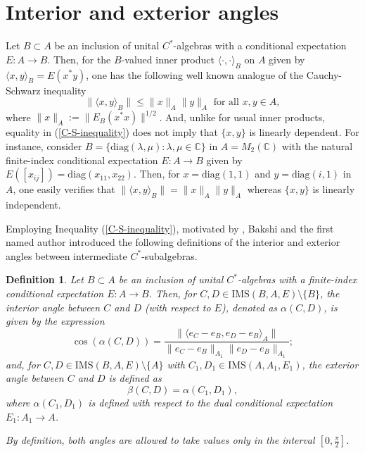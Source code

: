 \documentclass[a4]{amsart}
\newtheorem{definition}[theorem]{\bf Definition}
\numberwithin{equation}{section}
\newcommand{\la}{\langle}
\newcommand{\ra}{\rangle}
\newcommand{\C}{\mathbb{C}}
\begin{document}
\section{Interior and exterior angles}

     Let $B \subset A$ be an inclusion of unital $C^*$-algebras with a
     conditional expectation $E: A \to B$. Then, for the $B$-valued
     inner product $\la \cdot, \cdot\ra_B$ on $A$ given by $\la x, y
     \ra_B=E(x^*y)$, one has the following well known
     analogue of the Cauchy-Schwarz inequality
     \begin{equation}\label{C-S-inequality}
\|\la x, y \ra_B\| \leq \|x\|_A \|y\|_A \text{ for all } x, y \in A,
     \end{equation}
     where $\|x\|_A:=\|E_B(x^*x)\|^{1/2}$. And, unlike for usual inner products, equality in (\ref{C-S-inequality}) does
not imply that $\{x, y\}$ is linearly dependent. For instance,
consider $B = \{\mathrm{diag}(\lambda, \mu) : \lambda, \mu \in \C\}$
in $A= M_2(\C)$ with the natural finite-index conditional expectation
$E: A \to B$ given by $E([x_{ij}])= \mathrm{diag}(x_{11},
x_{22})$. Then, for $ x = \mathrm{diag}(1,1)$ and $ y =
\mathrm{diag}(i,1)$ in $A$, one easily verifies that
     \(
\|\la x, y \ra_B\| = \|x\|_A \|y\|_A
\)
whereas $\{x, y\}$ is linearly independent.

Employing Inequality (\ref{C-S-inequality}), motivated by
\cite{BDLR}, Bakshi and the first named author introduced the
following definitions of the interior and exterior angles between
intermediate $C^*$-subalgebras.
\begin{definition}\cite{BG2} 
     Let $B \subset A$ be an inclusion of unital $C^*$-algebras with a
     finite-index conditional expectation $E: A \to B$. Then, for $C,
     D \in \mathrm{IMS}(B, A, E)\setminus\{B\}$, the interior angle between $C$ and
     $D$ (with respect to $E$), denoted as $\alpha(C, D)$,  
     is given by the expression
     \begin{equation}\label{angle-int}
   \cos(\alpha(C,D)) = \frac{\|\langle e_C - e_B, e_D - e_B
     \rangle_{A} \|}{\| e_C - e_B\|_{A_1} \| e_D -
     e_B\|_{A_1}};
     \end{equation}
     and, for $C, D \in \mathrm{IMS}(B, A, E)\setminus\{A\}$ with
     $C_1, D_1 \in \mathrm{IMS}(A, A_1, E_1)$, the exterior angle
     between $C$ and $D$ is defined as
    \begin{equation}\label{angle-ext}
   \beta(C,D) = \alpha(C_1, D_1),
    \end{equation}
   where $\alpha(C_1, D_1)$ is defined with respect to the dual
   conditional expectation $E_1: A_1 \to A$.

   By definition, both angles are allowed to take values only in
the interval   $[0,\frac{\pi}{2}]$.
\end{definition}
\end{document}
